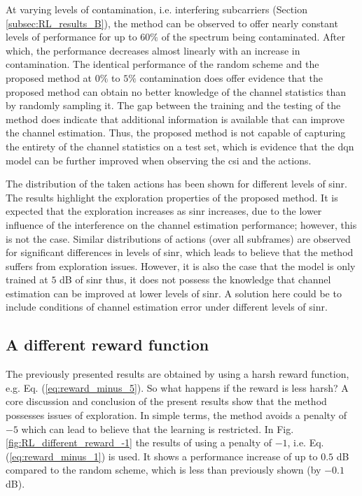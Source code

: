 At varying levels of contamination, i.e. interfering subcarriers (Section \ref{subsec:RL_results_B}), the method can be observed to offer nearly constant levels of performance for up to $60\%$ of the spectrum being contaminated. After which, the performance decreases almost linearly with an increase in contamination. The identical performance of the random scheme and the proposed method at $0\%$ to $5\%$ contamination does offer evidence that the proposed method can obtain no better knowledge of the channel statistics than by randomly sampling it. The gap between the training and the testing of the method does indicate that additional information is available that can improve the channel estimation. Thus, the proposed method is not capable of capturing the entirety of the channel statistics on a test set, which is evidence that the \gls{dqn} model can be further improved when observing the \gls{csi} and the actions. 

The distribution of the taken actions has been shown for different levels of \gls{sinr}. The results highlight the exploration properties of the proposed method. It is expected that the exploration increases as \gls{sinr} increases, due to the lower influence of the interference on the channel estimation performance; however, this is not the case. Similar distributions of actions (over all subframes) are observed for significant differences in levels of \gls{sinr}, which leads to believe that the method suffers from exploration issues. However, it is also the case that the model is only trained at $5$ dB of \gls{sinr} thus, it does not possess the knowledge that channel estimation can be improved at lower levels of \gls{sinr}. A solution here could be to include conditions of channel estimation error under different levels of \gls{sinr}.


\subsection{A different reward function}

\noindent The previously presented results are obtained by using a harsh reward function, e.g. Eq. (\ref{eq:reward_minus_5}). So what happens if the reward is less harsh? A core discussion and conclusion of the present results show that the method possesses issues of exploration. In simple terms, the method avoids a penalty of $-5$ which can lead to believe that the learning is restricted. In Fig. \ref{fig:RL_different_reward_-1} the results of using a penalty of $-1$, i.e. Eq. (\ref{eq:reward_minus_1}) is used. It shows a performance increase of up to $0.5$ dB compared to the random scheme, which is less than previously shown (by $-0.1$ dB).   

